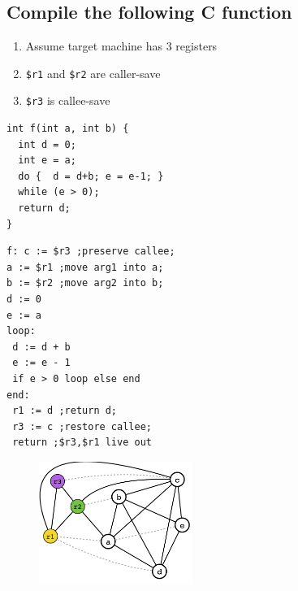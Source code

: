 \documentclass[a4paper]{exam}
\theoremstyle{definition}
\begin{document}
\subsection{Compile the following C function }
\begin{enumerate}
    \item Assume target machine has 3 registers
    \item \texttt{\$r1} and \texttt{\$r2} are caller-save
    \item \texttt{\$r3} is callee-save
\end{enumerate}
\begin{verbatim}
int f(int a, int b) { 
  int d = 0; 
  int e = a; 
  do {  d = d+b; e = e-1; } 
  while (e > 0); 
  return d;
}
\end{verbatim}
\begin{verbatim}
f: c := $r3 ;preserve callee;
a := $r1 ;move arg1 into a;
b := $r2 ;move arg2 into b;
d := 0
e := a
loop: 
 d := d + b 
 e := e - 1 
 if e > 0 loop else end
end: 
 r1 := d ;return d;
 r3 := c ;restore callee;
 return ;$r3,$r1 live out 
\end{verbatim}
\begin{figure}[htbp]
  \centering
  \includegraphics[width=5cm]{./img/reg_example2.png}
\end{figure}
\begin{solution}

\end{solution}
\printbibliography
\end{document}
